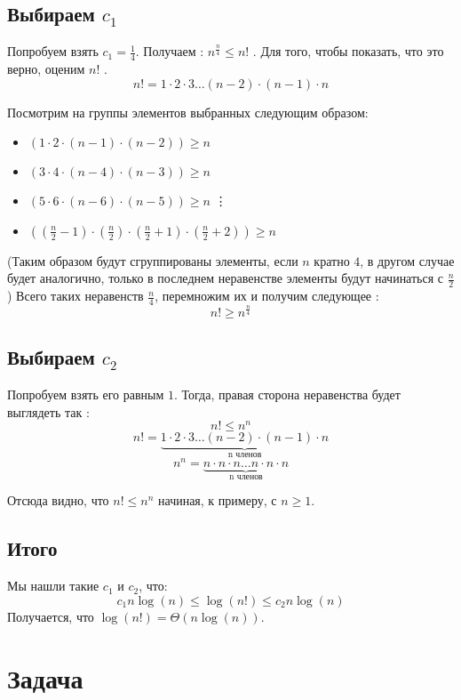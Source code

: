 \documentclass{article}
\begin{document}
\subsection{Выбираем $c_{1}$}
Попробуем взять $c_{1} = \frac{1}{4}$.  Получаем : $n^{\frac{n}{4}} \leq n!$ . 
Для того, чтобы показать, что это верно, оценим $n!$ .  
$$n! = 1 \cdot 2 \cdot 3 \dots (n - 2) \cdot (n - 1) \cdot n$$

Посмотрим на группы элементов выбранных следующим образом:
	\begin{itemize}
		\item $(1 \cdot 2 \cdot (n - 1) \cdot(n - 2)) \geq n$ 
		\item $(3 \cdot 4 \cdot (n - 4) \cdot (n - 3)) \geq n$ 
		\item $(5 \cdot 6 \cdot (n - 6) \cdot (n - 5)) \geq n$
		\newline
		\vdots
		\item $((\frac{n}{2} - 1) \cdot (\frac{n}{2}) \cdot (\frac{n}{2} + 1) \cdot (\frac{n}{2} + 2)) \geq n$
	\end{itemize}
	(Таким образом будут сгруппированы элементы, если $n$ кратно $4$, в другом случае будет аналогично, только в последнем неравенстве элементы будут начинаться с $\frac{n}{2}$)
\newline
Всего таких неравенств $\frac{n}{4}$, перемножим их и получим следующее :
$$ n! \geq n^{\frac{n}{4}}$$
\subsection{Выбираем $c_{2}$}
Попробуем взять его равным $1$.  Тогда, правая сторона неравенства будет выглядеть так : 
$$n! \leq n^{n}$$
$$n! = \underbrace{1 \cdot 2 \cdot 3 \dots (n - 2) \cdot (n - 1) \cdot n}_{\mbox{n членов}}$$
$$n^{n} = \underbrace{n \cdot n \cdot n \dots n \cdot n \cdot n}_{\mbox{n членов}}$$
\newline

Отсюда видно, что $n! \leq n^{n}$ начиная, к примеру, с $n \geq 1$.
\subsection{Итого}
Мы нашли такие $c_{1}$ и $c_{2}$, что:   $$c_{1}n\log(n) \leq \log(n!) \leq c_{2} n\log(n)$$ Получается, что $\log(n!) = \Theta(n\log(n))$.
\section{Задача }
\end{document}
